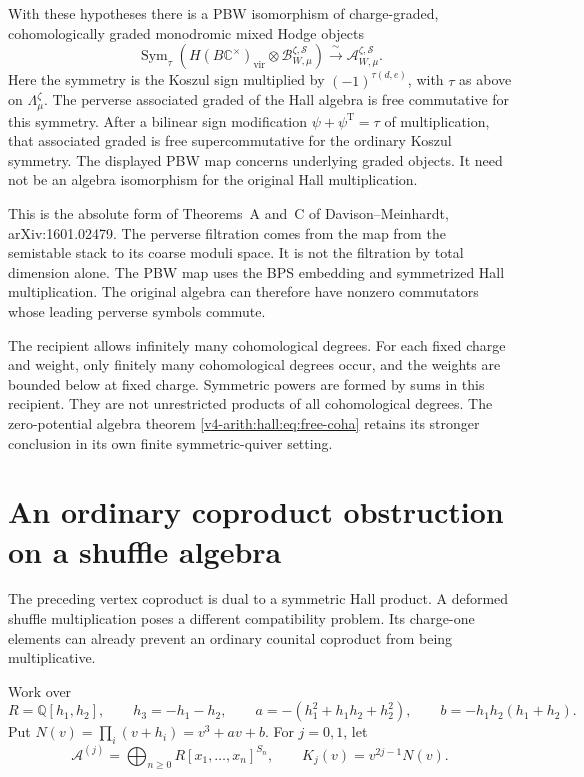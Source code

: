 \begin{theorem}
\label{v4-arith:hall:thm:critical-pbw}
With these hypotheses there is a PBW isomorphism of
charge-graded, cohomologically graded monodromic mixed Hodge objects
\[
 \operatorname{Sym}_{\tau}\left(
 H(B\mathbb C^\times)_{\mathrm{vir}}\otimes
 \mathcal B_{W,\mu}^{\zeta,\mathcal S}\right)
 \xrightarrow{\ \sim\ }\mathcal A_{W,\mu}^{\zeta,\mathcal S}.
\]
Here the symmetry is the Koszul sign multiplied by
$(-1)^{\tau(d,e)}$, with $\tau$ as above on
$\Lambda^\zeta_\mu$.
The perverse associated graded of the Hall algebra is free
commutative for this symmetry. After a bilinear sign modification
$\psi+\psi^{\mathrm T}=\tau$ of multiplication, that associated
graded is free supercommutative for the ordinary Koszul symmetry.
The displayed PBW map concerns underlying graded objects. It need
not be an algebra isomorphism for the original Hall multiplication.
\end{theorem}

This is the absolute form of Theorems~A and~C of
Davison--Meinhardt, arXiv:1601.02479. The perverse filtration comes
from the map from the semistable stack to its coarse moduli space.
It is not the filtration by total dimension alone. The PBW map uses
the BPS embedding and symmetrized Hall multiplication. The original
algebra can therefore have nonzero commutators whose leading
perverse symbols commute.

The recipient allows infinitely many cohomological degrees.
For each fixed charge and weight, only finitely many cohomological
degrees occur, and the weights are bounded below at fixed charge.
Symmetric powers are formed by sums in this recipient. They are
not unrestricted products of all cohomological degrees.
The zero-potential algebra theorem
\eqref{v4-arith:hall:eq:free-coha} retains its stronger conclusion
in its own finite symmetric-quiver setting.

\section{An ordinary coproduct obstruction on a shuffle algebra}
\label{v4-arith:hall:sec:cooperation}

The preceding vertex coproduct is dual to a symmetric Hall product.
A deformed shuffle multiplication poses a different compatibility
problem. Its charge-one elements can already prevent an ordinary
counital coproduct from being multiplicative.

Work over
\[
 R=\mathbb Q[h_1,h_2],\qquad h_3=-h_1-h_2,\qquad
 a=-(h_1^2+h_1h_2+h_2^2),\qquad b=-h_1h_2(h_1+h_2).
\]
Put $N(v)=\prod_i(v+h_i)=v^3+av+b$. For $j=0,1$, let
\[
 \mathcal A^{(j)}=\bigoplus_{n\geq0}R[x_1,\ldots,x_n]^{S_n},
 \qquad K_j(v)=v^{2j-1}N(v).
\]

